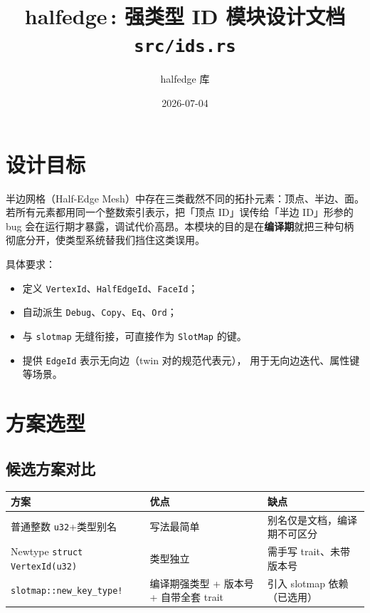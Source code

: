 \documentclass[11pt,a4paper]{article}
\title{\textbf{halfedge\,: 强类型 ID 模块设计文档} \\ \large \texttt{src/ids.rs}}
\author{halfedge 库}
\date{2026-07-04}
\begin{document}
\maketitle
\tableofcontents

\section{设计目标}

半边网格（Half-Edge Mesh）中存在三类截然不同的拓扑元素：顶点、半边、面。
若所有元素都用同一个整数索引表示，把「顶点 ID」误传给「半边 ID」形参的 bug
会在运行期才暴露，调试代价高昂。本模块的目的是在\textbf{编译期}就把三种句柄
彻底分开，使类型系统替我们挡住这类误用。

具体要求：
\begin{itemize}
  \item 定义 \texttt{VertexId}、\texttt{HalfEdgeId}、\texttt{FaceId}；
  \item 自动派生 \texttt{Debug}、\texttt{Copy}、\texttt{Eq}、\texttt{Ord}；
  \item 与 \texttt{slotmap} 无缝衔接，可直接作为 \texttt{SlotMap} 的键。
  \item 提供 \texttt{EdgeId} 表示无向边（twin 对的规范代表元），
        用于无向边迭代、属性键等场景。
\end{itemize}

\section{方案选型}

\subsection{候选方案对比}

\begin{center}
\renewcommand{\arraystretch}{1.25}
\begin{tabular}{p{3.4cm}|p{4.8cm}|p{4.8cm}}
  \hline
  \textbf{方案} & \textbf{优点} & \textbf{缺点} \\
  \hline
  普通整数 \texttt{u32}+类型别名 & 写法最简单 & 别名仅是文档，编译期不可区分 \\
  \hline
  Newtype \texttt{struct VertexId(u32)} & 类型独立 & 需手写 trait、未带版本号 \\
  \hline
  \texttt{slotmap::new\_key\_type!} & 编译期强类型 + 版本号 + 自带全套 trait & 引入 slotmap 依赖（已选用） \\
  \hline
\end{tabular}
\end{center}
\end{document}
